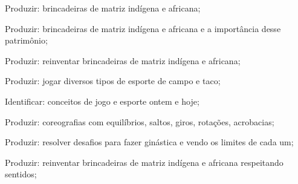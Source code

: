  Produzir: brincadeiras de matriz indígena e africana;

 Produzir: brincadeiras de matriz indígena e africana e a importância desse patrimônio;

 Produzir: reinventar brincadeiras de matriz indígena e africana;

 Produzir: jogar diversos tipos de esporte de campo e taco;

 Identificar: conceitos de jogo e esporte ontem e hoje;

 Produzir: coreografias com equilíbrios, saltos, giros, rotações, acrobacias;

 Produzir: resolver desafios para fazer ginástica e vendo os limites de cada um;

 Produzir: reinventar brincadeiras de matriz indígena e africana respeitando sentidos;

